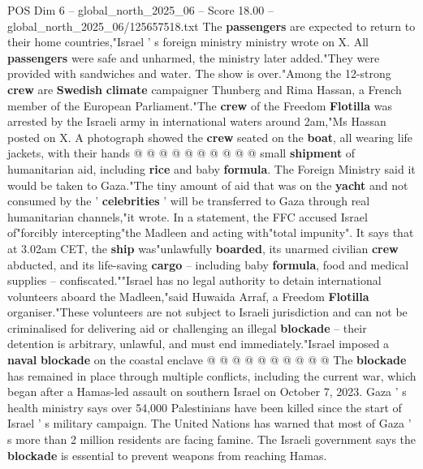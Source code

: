 \begin{textsample}{POS Dim 6 – global\_north\_2025\_06 – Score 18.00 – global\_north\_2025\_06/125657518.txt}
The \textbf{passengers} are expected to return to their home countries,"Israel ' s foreign ministry ministry wrote on X.
All \textbf{passengers} were safe and unharmed, the ministry later added."They were provided with sandwiches and water.
The show is over."Among the 12-strong \textbf{crew} are \textbf{Swedish} \textbf{climate} campaigner Thunberg and Rima Hassan, a French member of the European Parliament."The \textbf{crew} of the Freedom \textbf{Flotilla} was arrested by the Israeli army in international waters around 2am,"Ms Hassan posted on X.
A photograph showed the \textbf{crew} seated on the \textbf{boat}, all wearing life jackets, with their hands @ @ @ @ @ @ @ @ @ @ small \textbf{shipment} of humanitarian aid, including \textbf{rice} and baby \textbf{formula}.
The Foreign Ministry said it would be taken to Gaza."The tiny amount of aid that was on the \textbf{yacht} and not consumed by the ' \textbf{celebrities} ' will be transferred to Gaza through real humanitarian channels,"it wrote.
In a statement, the FFC accused Israel of"forcibly intercepting"the Madleen and acting with"total impunity".
It says that at 3.02am CET, the \textbf{ship} was"unlawfully \textbf{boarded}, its unarmed civilian \textbf{crew} abducted, and its life-saving \textbf{cargo} -- including baby \textbf{formula}, food and medical supplies -- confiscated.""Israel has no legal authority to detain international volunteers aboard the Madleen,"said Huwaida Arraf, a Freedom \textbf{Flotilla} organiser."These volunteers are not subject to Israeli jurisdiction and can not be criminalised for delivering aid or challenging an illegal \textbf{blockade} -- their detention is arbitrary, unlawful, and must end immediately."Israel imposed a \textbf{naval} \textbf{blockade} on the coastal enclave @ @ @ @ @ @ @ @ @ @ The \textbf{blockade} has remained in place through multiple conflicts, including the current war, which began after a Hamas-led assault on southern Israel on October 7, 2023.
Gaza ' s health ministry says over 54,000 Palestinians have been killed since the start of Israel ' s military campaign.
The United Nations has warned that most of Gaza ' s more than 2 million residents are facing famine.
The Israeli government says the \textbf{blockade} is essential to prevent weapons from reaching Hamas.

\end{textsample}
